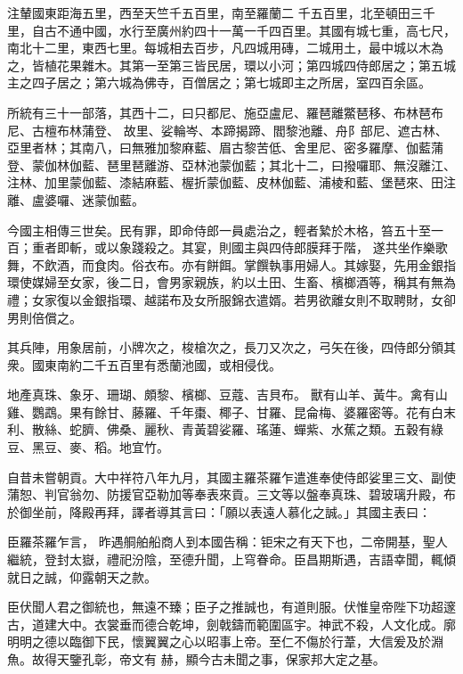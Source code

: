 \begin{pinyinscope}
 注輦國東距海五里，西至天竺千五百里，南至羅蘭二
 千五百里，北至頓田三千里，自古不通中國，水行至廣州約四十一萬一千四百里。其國有城七重，高七尺，南北十二里，東西七里。每城相去百步，凡四城用磚，二城用土，最中城以木為之，皆植花果雜木。其第一至第三皆民居，環以小河；第四城四侍郎居之；第五城主之四子居之；第六城為佛寺，百僧居之；第七城即主之所居，室四百余區。



 所統有三十一部落，其西十二，曰只都尼、施亞盧尼、羅琶離鱉琶移、布林琶布尼、古檀布林蒲登、
 故里、娑輪岑、本蹄揭蹄、閻黎池離、舟阝部尼、遮古林、亞里者林；其南八，曰無雅加黎麻藍、眉古黎苦低、舍里尼、密多羅摩、伽藍蒲登、蒙伽林伽藍、琶里琶離游、亞林池蒙伽藍；其北十二，曰撥囉耶、無沒離江、注林、加里蒙伽藍、漆結麻藍、楃折蒙伽藍、皮林伽藍、浦棱和藍、堡琶來、田注離、盧婆囉、迷蒙伽藍。



 今國主相傳三世矣。民有罪，即命侍郎一員處治之，輕者縶於木格，笞五十至一百；重者即斬，或以象踐殺之。其宴，則國主與四侍郎膜拜于階，
 遂共坐作樂歌舞，不飲酒，而食肉。俗衣布。亦有餅餌。掌饌執事用婦人。其嫁娶，先用金銀指環使媒婦至女家，後二日，會男家親族，約以土田、生畜、檳榔酒等，稱其有無為禮；女家復以金銀指環、越諾布及女所服錦衣遣婿。若男欲離女則不取聘財，女卻男則倍償之。



 其兵陣，用象居前，小牌次之，梭槍次之，長刀又次之，弓矢在後，四侍郎分領其衆。國東南約二千五百里有悉蘭池國，或相侵伐。



 地產真珠、象牙、珊瑚、頗黎、檳榔、豆蔻、吉貝布。
 獸有山羊、黃牛。禽有山雞、鸚鵡。果有餘甘、藤羅、千年棗、椰子、甘羅、昆侖梅、婆羅密等。花有白末利、散絲、蛇臍、佛桑、麗秋、青黃碧娑羅、瑤蓮、蟬紫、水蕉之類。五穀有綠豆、黑豆、麥、稻。地宜竹。



 自昔未嘗朝貢。大中祥符八年九月，其國主羅茶羅乍遣進奉使侍郎娑里三文、副使蒲恕、判官翁勿、防援官亞勒加等奉表來貢。三文等以盤奉真珠、碧玻璃升殿，布於御坐前，降殿再拜，譯者導其言曰：「願以表遠人慕化之誠。」其國主表曰：



 臣羅茶羅乍言，
 昨遇𦨴舶船商人到本國告稱：钜宋之有天下也，二帝開基，聖人繼統，登封太嶽，禮祀汾陰，至德升聞，上穹眷命。臣昌期斯遇，吉語幸聞，輒傾就日之誠，仰露朝天之款。



 臣伏聞人君之御統也，無遠不臻；臣子之推誠也，有道則服。伏惟皇帝陛下功超邃古，道建大中。衣裳垂而德合乾坤，劍戟鑄而範圍區宇。神武不殺，人文化成。廓明明之德以臨御下民，懷翼翼之心以昭事上帝。至仁不傷於行葦，大信爰及於淵魚。故得天鑒孔彰，帝文有
 赫，顯今古未聞之事，保家邦大定之基。




\end{pinyinscope}
